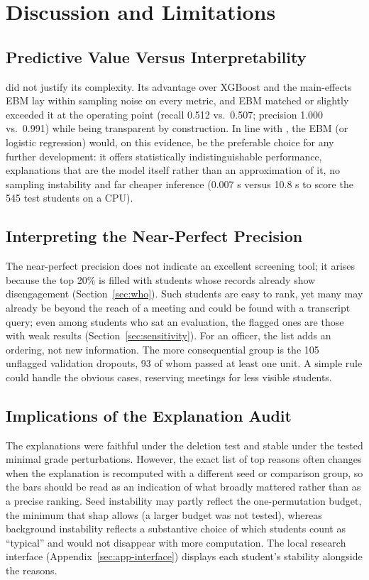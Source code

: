 \section{Discussion and Limitations}
\label{sec:discussion}

\subsection{Predictive Value Versus Interpretability}

\tabicl did not justify its complexity. Its advantage over XGBoost and the main-effects EBM lay
within sampling noise on every metric, and EBM matched or slightly exceeded it at the operating
point (recall 0.512 vs.\ 0.507; precision 1.000 vs.\ 0.991) while being transparent by
construction. In line with \citet{rudin2019stop}, the EBM (or logistic regression) would, on this
evidence, be the preferable choice for any further development: it offers statistically
indistinguishable performance, explanations that are the model itself rather than an approximation
of it, no sampling instability and far cheaper inference (0.007 s versus 10.8 s to score the 545
test students on a CPU).
\subsection{Interpreting the Near-Perfect Precision}

The near-perfect precision does not indicate an excellent screening tool; it arises because the top
20\% is filled with students whose records already show disengagement (Section~\ref{sec:who}). Such
students are easy to rank, yet many may already be beyond the reach of a meeting and could be found
with a transcript query; even among students who sat an evaluation, the flagged ones are those with
weak results (Section~\ref{sec:sensitivity}). For an officer, the list adds an ordering, not new
information. The more consequential group is the 105 unflagged validation dropouts, 93 of
whom passed at least one unit. A simple rule could handle the obvious cases, reserving meetings for
less visible students.

\subsection{Implications of the Explanation Audit}

The explanations were faithful under the deletion test and stable under the tested minimal grade
perturbations. However, the exact list of top reasons often changes when the
explanation is recomputed with a different seed or comparison group, so the bars should be read as
an indication of what broadly mattered rather than as a precise ranking. Seed instability may partly
reflect the one-permutation budget, the minimum that shap allows (a larger budget was not tested),
whereas background instability reflects a substantive choice of which students count as
``typical'' and would not disappear with more computation. The local research interface
(Appendix~\ref{sec:app-interface}) displays each student's stability alongside the reasons.

